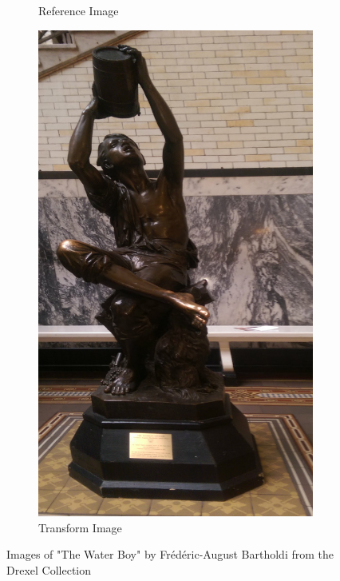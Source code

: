 \documentclass[sigconf]{acmart/acmart}
\begin{document}
\begin{figure}
\begin{subfigure}[b]{0.3\textwidth}
		\caption{Reference Image}
	\end{subfigure}
	\begin{subfigure}[b]{0.3\textwidth}
		\centering
		\includegraphics[width=\textwidth]{figures/alignment/waterboy_right}
		\caption{Transform Image}
	\end{subfigure}
	\caption{Images of "The Water Boy" by Frédéric-August Bartholdi from the Drexel Collection}
	\label{fig_waterboy_left_right}
\end{figure}
\end{document}
